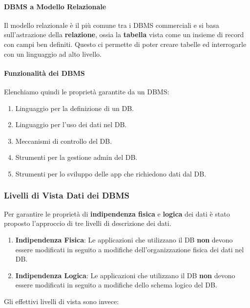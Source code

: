 \documentclass{article}
\begin{document}
\paragraph{DBMS a Modello Relazionale} Il modello relazionale è il più comune tra i DBMS commerciali e si basa sull'astrazione della \textbf{relazione}, ossia la \textbf{tabella}
vista come un insieme di record con campi ben definiti. Questo ci permette di poter creare tabelle ed interrogarle con un linguaggio ad alto livello.

\paragraph{Funzionalità dei DBMS} Elenchiamo quindi le proprietà garantite da un DBMS:

\begin{enumerate}
    \item Linguaggio per la definizione di un DB.
    \item Linguaggio per l'uso dei dati nel DB.
    \item Meccanismi di controllo del DB.
    \item Strumenti per la gestione admin del DB.
    \item Strumenti per lo sviluppo delle app che richiedono dati dal DB.
\end{enumerate}

\newpage

\subsubsection{Livelli di Vista Dati dei DBMS}

Per garantire le proprietà di \textbf{indipendenza fisica} e \textbf{logica} dei dati è stato proposto l'approccio di tre livelli di descrizione dei dati.

\begin{enumerate}
    \item \textbf{Indipendenza Fisica}: Le applicazioni che utilizzano il DB \textbf{non} devono essere modificati in seguito a modifiche dell'organizzazione fisica
    dei dati nel DB.
    \item \textbf{Indipendenza Logica}: Le applicazioni che utilizzano il DB \textbf{non} devono essere modificati in seguito a modifiche dello schema logico del DB.
\end{enumerate}

Gli effettivi livelli di vista sono invece:
\end{document}
